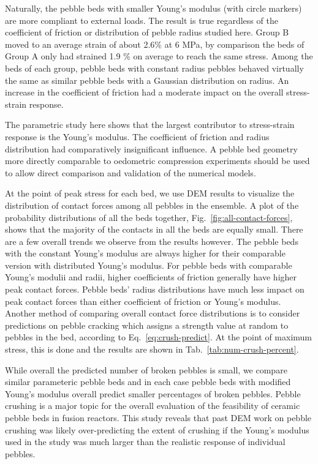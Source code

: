 Naturally, the pebble beds with smaller Young’s modulus (with circle markers) are more compliant to external loads. The result is true regardless of the coefficient of friction or distribution of pebble radius studied here. Group B moved to an average strain of about 2.6\% at 6 MPa, by comparison the beds of Group A only had strained 1.9 \% on average to reach the same stress. Among the beds of each group, pebble beds with constant radius pebbles behaved virtually the same as similar pebble beds with a Gaussian distribution on radius. An increase in the coefficient of friction had a moderate impact on the overall stress-strain response. 


The parametric study here shows that the largest contributor to stress-strain response is the Young’s modulus. The coefficient of friction and radius distribution had comparatively insignificant influence. A pebble bed geometry more directly comparable to oedometric compression experiments should be used to allow direct comparison and validation of the numerical models.


At the point of peak stress for each bed, we use DEM results to visualize the distribution of contact forces among all pebbles in the ensemble. A plot of the probability distributions of all the beds together, Fig.~\ref{fig:all-contact-forces}, shows that the majority of the contacts in all the beds are equally small. There are a few overall trends we observe from the results however. The pebble beds with the constant Young's modulus are always higher for their comparable version with distributed Young's modulus. For pebble beds with comparable Young's modulii and radii, higher coefficients of friction generally have higher peak contact forces. Pebble beds' radius distributions have much less impact on peak contact forces than either coefficient of friction or Young’s modulus. Another method of comparing overall contact force distributions is to consider predictions on pebble cracking which assigns a strength value at random to pebbles in the bed, according to Eq.~\ref{eq:crush-predict}. At the point of maximum stress, this is done and the results are shown in Tab.~\ref{tab:num-crush-percent}.

While overall the predicted number of broken pebbles is small, we compare similar parameteric pebble beds and in each case pebble beds with modified Young’s modulus overall predict smaller percentages of broken pebbles. Pebble crushing is a major topic for the overall evaluation of the feasibility of ceramic pebble beds in fusion reactors. This study reveals that past DEM work on pebble crushing was likely over-predicting the extent of crushing if the Young's modulus used in the study was much larger than the realistic response of individual pebbles.

